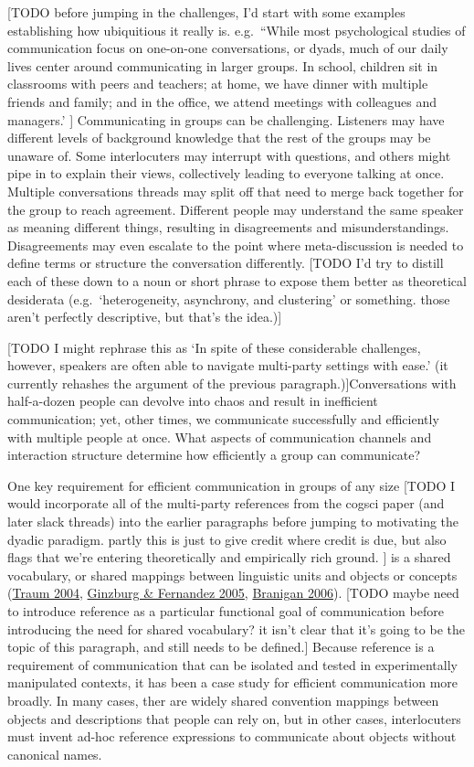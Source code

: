 \documentclass[
  english,
  a4paper,
]{article}
\begin{document}
{[}TODO before jumping in the challenges, I'd start with some examples establishing how ubiquitious it really is. e.g.~``While most psychological studies of communication focus on one-on-one conversations, or dyads, much of our daily lives center around communicating in larger groups. In school, children sit in classrooms with peers and teachers; at home, we have dinner with multiple friends and family; and in the office, we attend meetings with colleagues and managers.' {]}
Communicating in groups can be challenging. Listeners may have different levels of background knowledge that the rest of the groups may be unaware of. Some interlocuters may interrupt with questions, and others might pipe in to explain their views, collectively leading to everyone talking at once. Multiple conversations threads may split off that need to merge back together for the group to reach agreement. Different people may understand the same speaker as meaning different things, resulting in disagreements and misunderstandings. Disagreements may even escalate to the point where meta-discussion is needed to define terms or structure the conversation differently. {[}TODO I'd try to distill each of these down to a noun or short phrase to expose them better as theoretical desiderata (e.g.~`heterogeneity, asynchrony, and clustering' or something. those aren't perfectly descriptive, but that's the idea.){]}

{[}TODO I might rephrase this as `In spite of these considerable challenges, however, speakers are often able to navigate multi-party settings with ease.' (it currently rehashes the argument of the previous paragraph.){]}Conversations with half-a-dozen people can devolve into chaos and result in inefficient communication; yet, other times, we communicate successfully and efficiently with multiple people at once. What aspects of communication channels and interaction structure determine how efficiently a group can communicate?

One key requirement for efficient communication in groups of any size {[}TODO I would incorporate all of the multi-party references from the cogsci paper (and later slack threads) into the earlier paragraphs before jumping to motivating the dyadic paradigm. partly this is just to give credit where credit is due, but also flags that we're entering theoretically and empirically rich ground. {]} is a shared vocabulary, or shared mappings between linguistic units and objects or concepts (\protect\hyperlink{ref-traum2004}{Traum 2004}, \protect\hyperlink{ref-ginzburg2005}{Ginzburg \& Fernandez 2005}, \protect\hyperlink{ref-branigan2006}{Branigan 2006}). {[}TODO maybe need to introduce reference as a particular functional goal of communication before introducing the need for shared vocabulary? it isn't clear that it's going to be the topic of this paragraph, and still needs to be defined.{]} Because reference is a requirement of communication that can be isolated and tested in experimentally manipulated contexts, it has been a case study for efficient communication more broadly. In many cases, ther are widely shared convention mappings between objects and descriptions that people can rely on, but in other cases, interlocuters must invent ad-hoc reference expressions to communicate about objects without canonical names.
\end{document}
